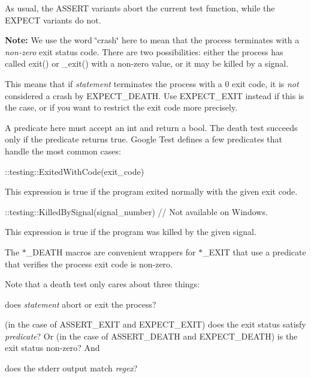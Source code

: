 As usual, the {\ttfamily A\+S\+S\+E\+RT} variants abort the current test function, while the {\ttfamily E\+X\+P\+E\+CT} variants do not.

{\bfseries Note\+:} We use the word \char`\"{}crash\char`\"{} here to mean that the process terminates with a {\itshape non-\/zero} exit status code. There are two possibilities\+: either the process has called {\ttfamily exit()} or {\ttfamily \+\_\+exit()} with a non-\/zero value, or it may be killed by a signal.

This means that if {\itshape statement} terminates the process with a 0 exit code, it is {\itshape not} considered a crash by {\ttfamily E\+X\+P\+E\+C\+T\+\_\+\+D\+E\+A\+TH}. Use {\ttfamily E\+X\+P\+E\+C\+T\+\_\+\+E\+X\+IT} instead if this is the case, or if you want to restrict the exit code more precisely.

A predicate here must accept an {\ttfamily int} and return a {\ttfamily bool}. The death test succeeds only if the predicate returns {\ttfamily true}. Google Test defines a few predicates that handle the most common cases\+:


\begin{DoxyCode}
::testing::ExitedWithCode(exit\_code)
\end{DoxyCode}


This expression is {\ttfamily true} if the program exited normally with the given exit code.


\begin{DoxyCode}
::testing::KilledBySignal(signal\_number)  // Not available on Windows.
\end{DoxyCode}


This expression is {\ttfamily true} if the program was killed by the given signal.

The {\ttfamily $\ast$\+\_\+\+D\+E\+A\+TH} macros are convenient wrappers for {\ttfamily $\ast$\+\_\+\+E\+X\+IT} that use a predicate that verifies the process\textquotesingle{} exit code is non-\/zero.

Note that a death test only cares about three things\+:


\begin{DoxyEnumerate}
\item does {\itshape statement} abort or exit the process?
\end{DoxyEnumerate}
\begin{DoxyEnumerate}
\item (in the case of {\ttfamily A\+S\+S\+E\+R\+T\+\_\+\+E\+X\+IT} and {\ttfamily E\+X\+P\+E\+C\+T\+\_\+\+E\+X\+IT}) does the exit status satisfy {\itshape predicate}? Or (in the case of {\ttfamily A\+S\+S\+E\+R\+T\+\_\+\+D\+E\+A\+TH} and {\ttfamily E\+X\+P\+E\+C\+T\+\_\+\+D\+E\+A\+TH}) is the exit status non-\/zero? And
\end{DoxyEnumerate}
\begin{DoxyEnumerate}
\item does the stderr output match {\itshape regex}?
\end{DoxyEnumerate}

